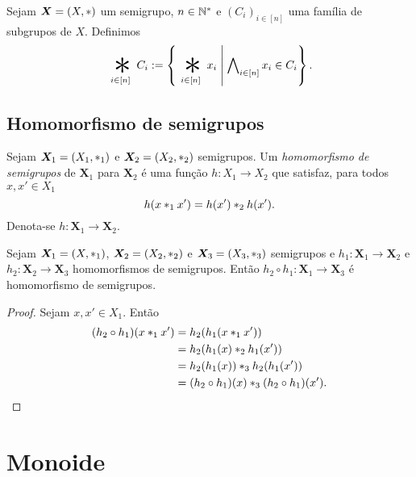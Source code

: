 \begin{definition}
Sejam $\bm X=(X,\ast)$ um semigrupo, $n \in \mathbb{N}^*$ e $(C_i)_{i \in [n]}$ uma família de subgrupos de $X$. Definimos
	\begin{equation*}
	\bigopb _{i \in [n]} C_i := \set{\bigopb _{i \in [n]} x_i}{\forall_{i \in [n]} x_i \in C_i}.
	\end{equation*}
\end{definition}

\subsection{Homomorfismo de semigrupos}

\begin{definition}
Sejam $\bm X_1=(X_1,\ast_1)$ e $\bm X_2=(X_2,\ast_2)$ semigrupos. Um \emph{homomorfismo de semigrupos} de $\bm X_1$ para $\bm X_2$ é uma função $h: X_1 \to X_2$ que satisfaz, para todos $x,x' \in X_1$
	\begin{equation*}
	h(x  \ast_1  x')=h(x') \ast_2 h(x').
	\end{equation*}
\noindent Denota-se $h: \bm X_1 \to \bm X_2$. %
\end{definition}

\begin{proposition}
\label{comp.hom.sem}
Sejam $\bm X_1=(X,\ast_1)$, $\bm X_2=(X_2,\ast_2)$ e $\bm X_3=(X_3,\ast_3)$ semigrupos e $h_1: \bm X_1 \to \bm X_2$ e $h_2: \bm X_2 \to \bm X_3$ homomorfismos de semigrupos. Então $h_2 \circ h_1: \bm X_1 \to \bm X_3$ é homomorfismo de semigrupos.
\end{proposition}
\begin{proof}
Sejam $x,x' \in X_1$. Então
	\begin{align*}
	(h_2 \circ h_1)(x \ast_1 x') &= h_2(h_1(x \ast_1 x')) \\
		&= h_2(h_1(x) \ast_2 h_1(x')) \\
		&= h_2(h_1 (x)) \ast_3 h_2(h_1(x')) \\
		&= (h_2 \circ h_1)(x) \ast_3 (h_2 \circ h_1)(x').
	\end{align*}
\end{proof}

\section{Monoide}

